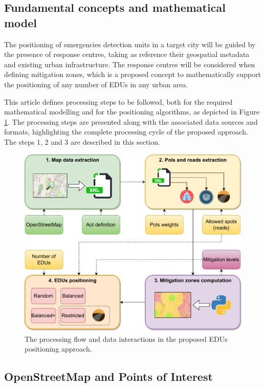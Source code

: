 \begin{refsection}
\section {Fundamental concepts and mathematical model}
\label{S:3}

The positioning of emergencies detection units in a target city will be guided by the presence of response centres, taking as reference their geospatial metadata and existing urban infrastructure. The response centres will be considered when defining mitigation zones, which is a proposed concept to mathematically support the positioning of any number of EDUs in any urban area. 

This article defines processing steps to be followed, both for the required mathematical modelling and for the positioning algorithms, as depicted in Figure \ref{Fig:figFluxograma}. The processing steps are presented along with the associated data sources and formats, highlighting the complete processing cycle of the proposed approach. The steps 1, 2 and 3 are described in this section.

\begin{figure}[htb!]
    \centering
    \includegraphics[width=0.85 \linewidth]{Chapters/2-EDUs/images/flowchart.drawio.pdf}
    \caption{The processing flow and data interactions in the proposed EDUs positioning approach.}
    \label{Fig:figFluxograma}
\end{figure}


\subsection{OpenStreetMap and Points of Interest}


\end{refsection}
